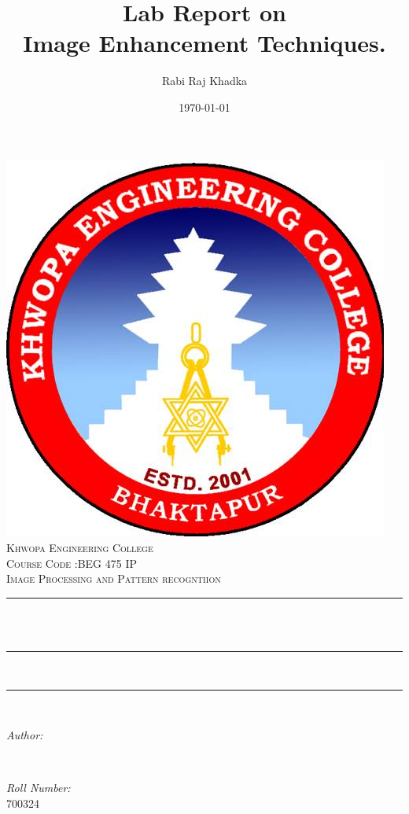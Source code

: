 \documentclass[12pt]{article}
\title{Lab Report on \\Image Enhancement Techniques.}								%
\author{Rabi Raj Khadka}								%
\date{\today}											%
\makeatletter
\let\thetitle\@title
\let\theauthor\@author
\let\thedate\@date
\makeatother
\begin{document}
\begin{titlepage}
	\centering
    \includegraphics[scale = 0.3]{kheclogo.jpg}\\[1.0 cm]	%
    \textsc{\LARGE Khwopa Engineering College}\\[1.5 cm]	%
	\textsc{\Large Course Code :BEG 475 IP}\\[0.5 cm]				%
	\textsc{\large Image Processing and Pattern recogntiion}\\[0.5 cm]				%
	\rule{\linewidth}{0.2 mm} \\[0.4 cm]
	{ \huge \bfseries \thetitle}\\
	\rule{\linewidth}{0.2 mm} \\[1.0 cm]
	
	
	\rule{\linewidth}{0 mm} \\[1.0 cm]

	\begin{minipage}{0.4\textwidth}
		\begin{flushleft} \large
			\emph{Author:}\\
			\theauthor
			\end{flushleft}
			\end{minipage}~
			\begin{minipage}{0.4\textwidth}
			\begin{flushright} \large
			\emph{Roll  Number:} \\
			700324									%
		\end{flushright}
	\end{minipage}\\[2cm]
	
	{\large \thedate}\\[2 cm]
 
	\vfill
	
\end{titlepage}
\tableofcontents
\pagebreak
\end{document}

